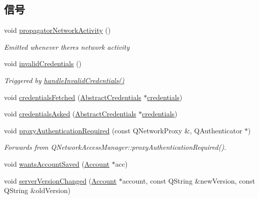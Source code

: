 \subsection*{信号}
\begin{DoxyCompactItemize}
\item 
void \hyperlink{class_o_c_c_1_1_account_a9eed0b9618b1789cc9e16352f79a823d}{propagator\+Network\+Activity} ()
\begin{DoxyCompactList}\small\item\em Emitted whenever there\textquotesingle{}s network activity \end{DoxyCompactList}\item 
void \hyperlink{class_o_c_c_1_1_account_aeb4f6dd55bbe3c921f80bbc34bd82c0c}{invalid\+Credentials} ()
\begin{DoxyCompactList}\small\item\em Triggered by \hyperlink{class_o_c_c_1_1_account_a3df5d30b88c86ec96f066a5a01373156}{handle\+Invalid\+Credentials()} \end{DoxyCompactList}\item 
void \hyperlink{class_o_c_c_1_1_account_a23d58f3d44c684a6ed7c0e4ecc0039ab}{credentials\+Fetched} (\hyperlink{class_o_c_c_1_1_abstract_credentials}{Abstract\+Credentials} $\ast$\hyperlink{class_o_c_c_1_1_account_aead250da94c2a743e702268f60a6e781}{credentials})
\item 
void \hyperlink{class_o_c_c_1_1_account_ad0f9b3ecec3d0ebd63f68b114b48182c}{credentials\+Asked} (\hyperlink{class_o_c_c_1_1_abstract_credentials}{Abstract\+Credentials} $\ast$\hyperlink{class_o_c_c_1_1_account_aead250da94c2a743e702268f60a6e781}{credentials})
\item 
void \hyperlink{class_o_c_c_1_1_account_a44bc67fd9df027b4172900ea8b417d29}{proxy\+Authentication\+Required} (const Q\+Network\+Proxy \&, Q\+Authenticator $\ast$)
\begin{DoxyCompactList}\small\item\em Forwards from Q\+Network\+Access\+Manager\+::proxy\+Authentication\+Required(). \end{DoxyCompactList}\item 
void \hyperlink{class_o_c_c_1_1_account_ade354858c36394bc2327828a16fa9e36}{wants\+Account\+Saved} (\hyperlink{class_o_c_c_1_1_account}{Account} $\ast$acc)
\item 
void \hyperlink{class_o_c_c_1_1_account_a85d8f49cf4bf7d670e3524c043217e61}{server\+Version\+Changed} (\hyperlink{class_o_c_c_1_1_account}{Account} $\ast$account, const Q\+String \&new\+Version, const Q\+String \&old\+Version)
\end{DoxyCompactItemize}
